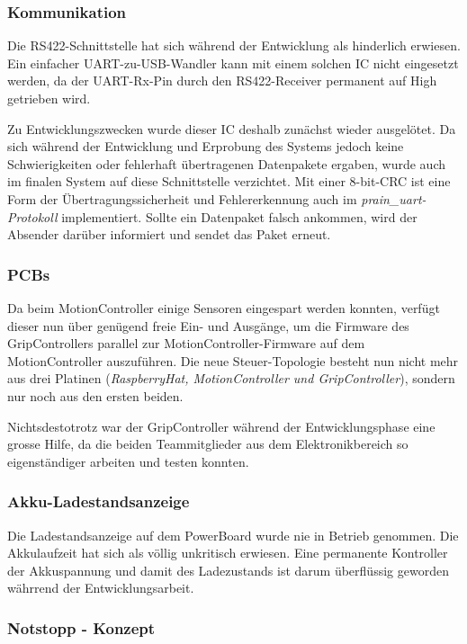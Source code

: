 \documentclass[main.tex]{subfiles} %
\begin{document}
\subsubsection*{Kommunikation}

Die RS422-Schnittstelle hat sich während der Entwicklung als hinderlich
erwiesen. Ein einfacher UART-zu-USB-Wandler kann mit einem solchen IC nicht
eingesetzt werden, da der UART-Rx-Pin durch den RS422-Receiver permanent auf
High getrieben wird.

Zu Entwicklungszwecken wurde dieser IC deshalb zunächst wieder ausgelötet. Da
sich während der Entwicklung und Erprobung des Systems jedoch keine
Schwierigkeiten oder fehlerhaft übertragenen Datenpakete ergaben, wurde auch im
finalen System auf diese Schnittstelle verzichtet. Mit einer 8-bit-CRC ist eine
Form der Übertragungssicherheit und Fehlererkennung auch im
\textit{prain\_uart-Protokoll} implementiert. Sollte ein Datenpaket falsch
ankommen, wird der Absender darüber informiert und sendet das Paket erneut.

\subsubsection*{PCBs}

Da beim MotionController einige Sensoren eingespart werden konnten, verfügt
dieser nun über genügend freie Ein- und Ausgänge, um die Firmware des
GripControllers parallel zur MotionController-Firmware auf dem MotionController
auszuführen. Die neue Steuer-Topologie besteht nun nicht mehr aus drei Platinen
(\textit{RaspberryHat, MotionController und GripController}), sondern nur noch
aus den ersten beiden.

Nichtsdestotrotz war der GripController während der Entwicklungsphase eine
grosse Hilfe, da die beiden Teammitglieder aus dem Elektronikbereich so
eigenständiger arbeiten und testen konnten.

\subsubsection*{Akku-Ladestandsanzeige}

Die Ladestandsanzeige auf dem PowerBoard wurde nie in Betrieb genommen. Die
Akkulaufzeit hat sich als völlig unkritisch erwiesen. Eine permanente
Kontroller der Akkuspannung und damit des Ladezustands ist darum überflüssig
geworden währrend der Entwicklungsarbeit.

\subsubsection*{Notstopp - Konzept}
\end{document}
